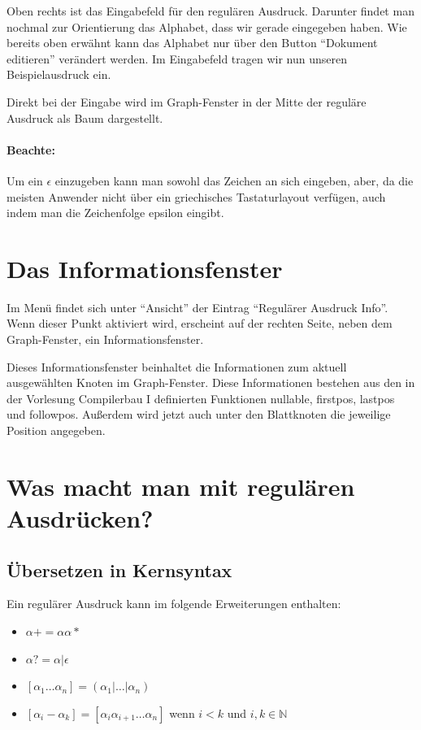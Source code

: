 Oben rechts ist das Eingabefeld für den regulären Ausdruck. Darunter findet man nochmal zur Orientierung das Alphabet, dass wir gerade eingegeben haben. Wie bereits oben erwähnt kann das Alphabet nur über den Button "`Dokument editieren"' verändert werden. Im Eingabefeld tragen wir nun unseren Beispielausdruck  ein.

Direkt bei der Eingabe wird im Graph-Fenster in der Mitte der reguläre Ausdruck als Baum dargestellt.

\paragraph*{Beachte:} Um ein $\epsilon$ einzugeben kann man sowohl das Zeichen an sich eingeben, aber, da die meisten Anwender nicht über ein griechisches Tastaturlayout verfügen, auch indem man die Zeichenfolge epsilon eingibt.

\section{Das Informationsfenster}

Im Menü findet sich unter "`Ansicht"' der Eintrag "`Regulärer Ausdruck Info"'. Wenn dieser Punkt aktiviert wird, erscheint auf der rechten Seite, neben dem Graph-Fenster, ein Informationsfenster.

Dieses Informationsfenster beinhaltet die Informationen zum aktuell ausgewählten Knoten im Graph-Fenster. Diese Informationen bestehen aus den in der Vorlesung Compilerbau I definierten Funktionen nullable, firstpos, lastpos und followpos. Außerdem wird jetzt auch unter den Blattknoten die jeweilige Position angegeben.

\section{Was macht man mit regulären Ausdrücken?}

\subsection{Übersetzen in Kernsyntax}

Ein regulärer Ausdruck kann im \gtitool folgende Erweiterungen enthalten:

\begin{itemize}
  \item $\alpha+ = \alpha \alpha*$
  \item $\alpha? = \alpha|\epsilon$
  \item $[\alpha _1\ldots\alpha _n] = (\alpha _1|\ldots|\alpha _n)$
  \item $[\alpha _i - \alpha _k] = [\alpha _i \alpha _{i+1}\ldots\alpha _n]$ wenn $i < k$ und $i,k\in{\mathbb N}$
\end{itemize}


